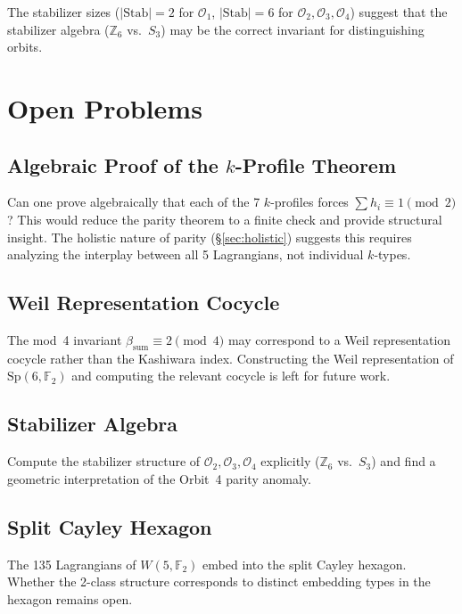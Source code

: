\documentclass[11pt,a4paper]{article}
\theoremstyle{remark}
\newcommand{\Z}{\mathbb{Z}}
\newcommand{\F}{\mathbb{F}}
\begin{document}
The stabilizer sizes ($|\mathrm{Stab}| = 2$ for $\mathcal{O}_1$, $|\mathrm{Stab}| = 6$ for $\mathcal{O}_2, \mathcal{O}_3, \mathcal{O}_4$) suggest that the stabilizer algebra ($\Z_6$ vs.\ $S_3$) may be the correct invariant for distinguishing orbits.


\section{Open Problems}\label{sec:open}

\subsection{\texorpdfstring{Algebraic Proof of the $k$-Profile Theorem}{Algebraic Proof of the k-Profile Theorem}}

Can one prove algebraically that each of the 7 $k$-profiles forces $\sum h_i \equiv 1 \pmod{2}$?
This would reduce the parity theorem to a finite check and provide structural insight.
The holistic nature of parity (\S\ref{sec:holistic}) suggests this requires analyzing the interplay between all 5 Lagrangians, not individual $k$-types.

\subsection{Weil Representation Cocycle}

The mod~4 invariant $\beta_{\mathrm{sum}} \equiv 2 \pmod{4}$ may correspond to a Weil representation cocycle rather than the Kashiwara index.
Constructing the Weil representation of $\mathrm{Sp}(6, \F_2)$ and computing the relevant cocycle is left for future work.

\subsection{Stabilizer Algebra}

Compute the stabilizer structure of $\mathcal{O}_2, \mathcal{O}_3, \mathcal{O}_4$ explicitly ($\Z_6$ vs.\ $S_3$) and find a geometric interpretation of the Orbit~4 parity anomaly.

\subsection{Split Cayley Hexagon}

The 135 Lagrangians of $W(5, \F_2)$ embed into the split Cayley hexagon.
Whether the 2-class structure corresponds to distinct embedding types in the hexagon remains open.
\end{document}
